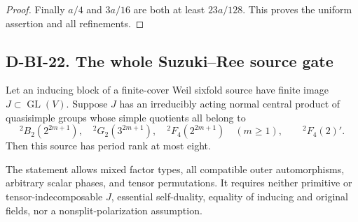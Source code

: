 \begin{proof}
Finally $a/4$ and $3a/16$ are both at least $23a/128$.
This proves the uniform assertion and all refinements.
\end{proof}

\subsection*{D-BI-22. The whole Suzuki--Ree source gate}

\begin{theorem}
\label{D-BI-22}
Let an inducing block of a finite-cover Weil sixfold source have
finite image $J\subset\operatorname{GL}(V)$.  Suppose $J$ has
an irreducibly acting normal central product of quasisimple
groups whose simple quotients all belong to
\[
 {}^2B_2(2^{2m+1}),\quad{}^2G_2(3^{2m+1}),\quad
 {}^2F_4(2^{2m+1})\quad(m\ge1),\qquad{}^2F_4(2)'.
\]
Then this source has period rank at most eight.

The statement allows mixed factor types, all compatible outer
automorphisms, arbitrary scalar phases, and tensor permutations.
It requires neither primitive or tensor-indecomposable $J$,
essential self-duality, equality of inducing and original fields,
nor a nonsplit-polarization assumption.
\end{theorem}

